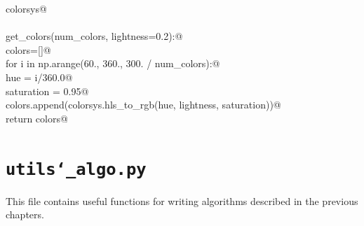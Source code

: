\documentclass[10pt, english, oneside]{report}
\begin{document}
\begin{appendices}
\begin{flushleft}
\begin{list}{}{}
\mbox{}\verb@import colorsys@\\
\mbox{}\verb@@\\
\mbox{}\verb@def get_colors(num_colors, lightness=0.2):@\\
\mbox{}\verb@    colors=[]@\\
\mbox{}\verb@    for i in np.arange(60., 360., 300. / num_colors):@\\
\mbox{}\verb@        hue        = i/360.0@\\
\mbox{}\verb@        saturation = 0.95@\\
\mbox{}\verb@        colors.append(colorsys.hls_to_rgb(hue, lightness, saturation))@\\
\mbox{}\verb@    return colors@\\
\mbox{}\verb@@{\NWsep}
\end{list}
\vspace{-1.5ex}
\footnotesize
\begin{list}{}{\setlength{\itemsep}{-\parsep}\setlength{\itemindent}{-\leftmargin}}

\item{}
\end{list}
\vspace{4ex}
\end{flushleft}

\newpage

\chapter{\texttt{utils\char`_algo.py}}

This file contains useful functions for writing algorithms described in the previous chapters.


\end{appendices}
\end{document}
